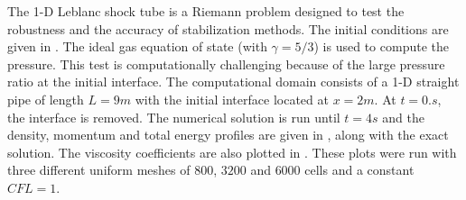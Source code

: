 The 1-D Leblanc shock tube is a Riemann problem designed to test the robustness and the accuracy of stabilization methods. The initial conditions are given in . The ideal gas equation of state (with $\gamma=5/3$) is used to compute the pressure.
This test is computationally challenging because of the large pressure ratio at the initial interface.
The computational domain consists of a 1-D straight pipe of length $L=9m$ with the initial interface located at $x=2m$. At $t=0.s$, the interface is removed. The numerical solution is run until $t=4 s$ and the density, momentum and total energy profiles are given in , along with the exact solution. The viscosity coefficients are also plotted in . These plots were  run with three different uniform meshes of $800$, $3200$ and $6000$ cells and a constant $CFL = 1$.
